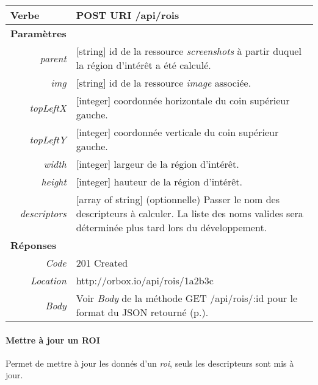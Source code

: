 \begin{appendices}
\begin{absolutelynopagebreak}
\begin{tabular}{@{}p{2cm}p{11.5cm}@{}}
    \toprule
    \textbf{Verbe}                        & POST \hspace{2.5cm} \textbf{URI} \hspace{0.25cm} /api/rois   \\ \midrule
    \textbf{Paramètres}                   &        \\
    \multicolumn{1}{r}{\textit{parent}}  & [string] id de la ressource \emph{screenshots} à partir duquel la région d'intérêt a été calculé. \\ 
    \multicolumn{1}{r}{\textit{img}}  & [string] id de la ressource \emph{image} associée. \\
    \multicolumn{1}{r}{\textit{topLeftX}}  & [integer] coordonnée horizontale du coin supérieur gauche.  \\ 
    \multicolumn{1}{r}{\textit{topLeftY}}  & [integer] coordonnée verticale du coin supérieur gauche. \\ 
    \multicolumn{1}{r}{\textit{width}}  & [integer] largeur de la région d'intérêt.\\ 
    \multicolumn{1}{r}{\textit{height}}  & [integer] hauteur de la région d'intérêt. \\
    \multicolumn{1}{r}{\textit{descriptors}} & [array of string] (optionnelle) 
    Passer le nom des descripteurs à calculer.
    La liste des noms valides sera déterminée plus tard lors du développement. \\
    \midrule
    \textbf{Réponses}                     &        \\
    \multicolumn{1}{r}{\textit{Code}}   & 201 Created \\
    \multicolumn{1}{r}{\textit{Location}}   & http://orbox.io/api/rois/1a2b3c \\\multicolumn{1}{r}{\textit{Body}}   & Voir \emph{Body} de la méthode GET /api/rois/:id pour le format du JSON retourné (p.\pageref{jsonHalROIs}). \\ \bottomrule
    \end{tabular}
\end{absolutelynopagebreak}

\begin{absolutelynopagebreak}
\paragraph{Mettre à jour un ROI}

Permet de mettre à jour les donnés d'un \emph{roi}, seuls les descripteurs sont mis à jour.


\end{absolutelynopagebreak}
\end{appendices}

